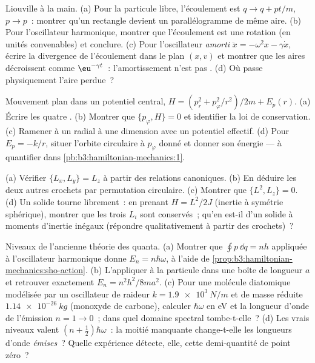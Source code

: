 \begin{exercise}[$\star\star$]\label{exo:b3:hamiltonian-mechanics:7}
Liouville à la main. (a) Pour la particule libre, l'écoulement est $q \to q +
pt/m$, $p \to p$~: montrer qu'un rectangle devient un parallélogramme
de même aire. (b) Pour l'oscillateur harmonique, montrer que
l'écoulement est une rotation (en unités convenables) et conclure. (c)
Pour l'oscillateur \emph{amorti} $\ddot x = -\omega^2x - \gamma\dot x$,
écrire la divergence de l'écoulement dans le plan $(x, v)$ et montrer
que les aires décroissent comme $\eu^{-\gamma t}$~: l'amortissement
n'est pas . (d) Où passe physiquement l'aire perdue~?
\end{exercise}

\begin{exercise}[$\star\star$]\label{exo:b3:hamiltonian-mechanics:8}
Mouvement plan dans un potentiel central, $H = (p_r^2 + p_\varphi^2/r^2)/2m
+ E_p(r)$. (a) Écrire les quatre . (b) Montrer que $\{
p_\varphi, H\} = 0$ et identifier la loi de conservation. (c) Ramener à
un  radial à une dimension avec un potentiel effectif. (d)
Pour $E_p = -k/r$, situer l'orbite circulaire à $p_\varphi$ donné et
donner son énergie --- à quantifier dans
\cref{pb:b3:hamiltonian-mechanics:1}.
\end{exercise}

\begin{exercise}[$\star\star$]\label{exo:b3:hamiltonian-mechanics:9}
(a) Vérifier $\{L_x, L_y\} = L_z$ à partir des relations canoniques.
(b) En déduire les deux autres crochets par permutation circulaire.
(c) Montrer que $\{L^2, L_z\} = 0$. (d) Un solide tourne librement~: en prenant $H =
L^2/2J$ (inertie à symétrie sphérique), montrer que les trois $L_i$
sont conservés~; qu'en est-il d'un solide à moments d'inertie inégaux
(répondre qualitativement à partir des crochets)~?
\end{exercise}

\begin{exercise}[$\star\star\star$]\label{exo:b3:hamiltonian-mechanics:10}
Niveaux de l'ancienne théorie des quanta. (a) Montrer que
$\oint p\,\dd q = nh$ appliquée à l'oscillateur harmonique donne
$E_n = n\hbar\omega$, à l'aide de
\cref{prop:b3:hamiltonian-mechanics:sho-action}. (b) L'appliquer à la
particule dans une boîte de longueur $a$ et retrouver exactement $E_n =
n^2h^2/8ma^2$. (c) Pour une molécule diatomique modélisée par un
oscillateur de raideur $k = \qty{1.9e3}{N/m}$ et de masse réduite $\qty{1.14e-26}
{kg}$ (monoxyde de carbone), calculer $\hbar\omega$ en eV et la
longueur d'onde de l'émission $n = 1 \to 0$~; dans quel domaine
spectral tombe-t-elle~? (d) Les vrais niveaux valent
$(n + \tfrac12)\hbar\omega$~: la moitié manquante change-t-elle les
longueurs d'onde \emph{émises}~? Quelle expérience détecte, elle, cette
demi-quantité de point zéro~?
\end{exercise}

